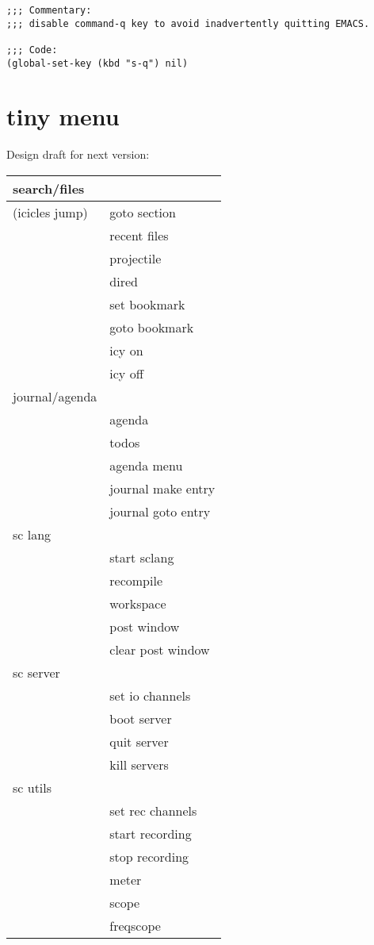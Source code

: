\documentclass[11pt]{article}
\begin{document}
\begin{verbatim}
;;; Commentary:
;;; disable command-q key to avoid inadvertently quitting EMACS.

;;; Code:
(global-set-key (kbd "s-q") nil)
\end{verbatim}

\section{tiny menu}
\label{sec:org233ae15}

Design draft for next version:

\begin{center}
\begin{tabular}{ll}
\hline
\hline
search/files & \\
\hline
(icicles jump) & goto section\\
 & recent files\\
 & projectile\\
 & dired\\
 & set bookmark\\
 & goto bookmark\\
 & icy on\\
 & icy off\\
\hline
journal/agenda & \\
\hline
 & agenda\\
 & todos\\
 & agenda menu\\
 & journal make entry\\
 & journal goto entry\\
\hline
sc lang & \\
\hline
 & start sclang\\
 & recompile\\
 & workspace\\
 & post window\\
 & clear post window\\
\hline
sc server & \\
\hline
 & set io channels\\
 & boot server\\
 & quit server\\
 & kill servers\\
\hline
sc utils & \\
\hline
 & set rec channels\\
 & start recording\\
 & stop recording\\
 & meter\\
 & scope\\
 & freqscope\\
\hline
\end{tabular}
\end{center}
\end{document}

